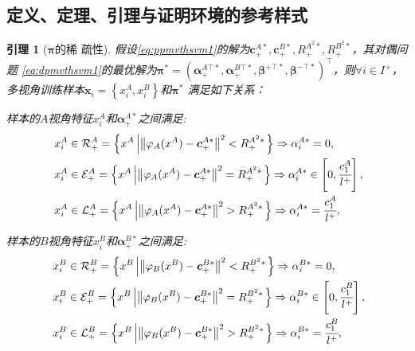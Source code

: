 \documentclass[twoside,zihao=-4,UTF8]{bjfu}
\begin{document}
\subsection{定义、定理、引理与证明环境的参考样式}
\newtheorem{lemma}{引理}
\begin{lemma}[$\boldsymbol{\pi}$的稀
	疏性] \label{lemma:sparsity}
	假设\eqref{eq:ppmvthsvm1}的解为$\boldsymbol{c}_{+}^{A*}, 
	\boldsymbol{c}_{+}^{B*},R_{+}^{{{A}^{2}*}},R_{+}^{{{B}^{2}*}}$，其对偶问题
	\eqref{eq:dpmvthsvm1}的最优解为$\boldsymbol{\pi}^{*} 
	=\left(\boldsymbol{\alpha 
	}_{+}^{A\top*},\boldsymbol{\alpha }_{+}^{B\top*},\boldsymbol{\beta 
	}^{+\top*},\boldsymbol{\beta }^{-\top*} 
	\right)^{\top}$，则$\forall i \in 
	I^{+}$，多视角训练样本$\boldsymbol{x}_{i} = 
	\left\{x_{i}^{A},x_{i}^{B}\right\}$和$\boldsymbol{\pi}^{*}$
	满足如下关系：
	
样本的$A$视角特征$x_{i}^{A}$和$\boldsymbol{\alpha}_{+}^{A*}$之间满足:
	\begin{align}\ 
	&  x_{i}^{A} \in \mathcal{R}_{+}^{A} = \left\{x^{A} \left| {{\left\| 
	{{\varphi 
	}_{A}}( x^{A} )-\boldsymbol{c}_{+}^{A*} 
	\right\|}^{2}} < R_{+}^{{{A}^{2}*}} \right. \right\} \Rightarrow 
	\alpha_{i}^{A*} = 0, \\
	& x_{i}^{A} \in \mathcal{E}_{+}^{A} = \left\{x^{A} \left| {{\left\| 
	{{\varphi 
				}_{A}}( x^{A} )-\boldsymbol{c}_{+}^{A*} 
			\right\|}^{2}} = R_{+}^{{{A}^{2}*}} \right. \right\} \Rightarrow 
	\alpha_{i}^{A*} \in \left[0, \cfrac{c_{1}^{A}}{l^{+}}\right], \\
	& x_{i}^{A} \in \mathcal{L}_{+}^{A} = \left\{x^{A} \left| {{\left\| 
	{{\varphi 
				}_{A}}( x^{A} )-\boldsymbol{c}_{+}^{A*} 
			\right\|}^{2}} > R_{+}^{{{A}^{2}*}} \right. \right\} \Rightarrow 
	\alpha_{i}^{A*} = \cfrac{c_{1}^{A}}{l^{+}}, 
	\end{align}

样本的$B$视角特征$x_{i}^{B}$和$\boldsymbol{\alpha}_{+}^{B*}$之间满足:
\begin{align}\ 
	&  x_{i}^{B} \in \mathcal{R}_{+}^{B} = \left\{x^{B} \left| {{\left\| 
			{{\varphi 
				}_{B}}( x^{B} )-\boldsymbol{c}_{+}^{B*} 
			\right\|}^{2}} < R_{+}^{{{B}^{2}*}} \right. \right\} \Rightarrow 
	\alpha_{i}^{B*} = 0, \\
	& x_{i}^{B} \in \mathcal{E}_{+}^{B} = \left\{x^{B} \left| {{\left\| 
			{{\varphi 
				}_{B}}( x^{B} )-\boldsymbol{c}_{+}^{B*} 
			\right\|}^{2}} = R_{+}^{{{B}^{2}*}} \right. \right\} \Rightarrow 
	\alpha_{i}^{B*} \in \left[0, \cfrac{c_{1}^{B}}{l^{+}}\right], \\
	& x_{i}^{B} \in \mathcal{L}_{+}^{B} = \left\{x^{B} \left| {{\left\| 
			{{\varphi 
				}_{B}}( x^{B} )-\boldsymbol{c}_{+}^{B*} 
			\right\|}^{2}} > R_{+}^{{{B}^{2}*}} \right. \right\} \Rightarrow 
	\alpha_{i}^{B*} = \cfrac{c_{1}^{B}}{l^{+}}, 
\end{align}


\end{lemma}
\end{document}
